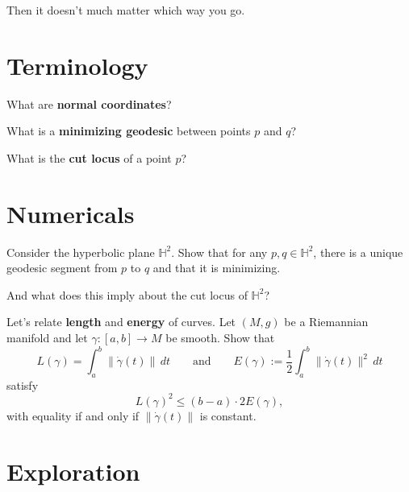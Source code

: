 \documentclass{homework}
\author{Jim Fowler}
\begin{document}
\maketitle

\begin{inspiration}
  Then it doesn't much matter which way you go.
\end{inspiration}

\section{Terminology}

\begin{problem}
  What are \textbf{normal coordinates}?
\end{problem}

\begin{problem}
  What is a \textbf{minimizing geodesic} between points $p$ and $q$?
\end{problem}

\begin{problem}
  What is the \textbf{cut locus} of a point $p$?
\end{problem}

\section{Numericals}

\begin{problem}
  Consider the hyperbolic plane $\mathbb{H}^2$. Show that for any $p,q \in \mathbb{H}^2$, there is a unique geodesic segment from $p$ to $q$ and that it is minimizing.

  And what does this imply about the cut locus of $\mathbb{H}^2$?
\end{problem}

\begin{problem}
  Let's relate \textbf{length} and \textbf{energy} of curves. Let $(M,g)$ be a Riemannian manifold and let $\gamma:[a,b]\to M$ be smooth.
  Show that
  \[
    L(\gamma)=\int_a^b \|\dot\gamma(t)\|\,dt
    \qquad\text{and}\qquad
    E(\gamma):=\frac12\int_a^b \|\dot\gamma(t)\|^2\,dt
  \]
  satisfy
  \[
    L(\gamma)^2 \le (b-a)\cdot 2E(\gamma),
  \]
  with equality if and only if $\|\dot\gamma(t)\|$ is constant.
\end{problem}

\section{Exploration}
\end{document}
